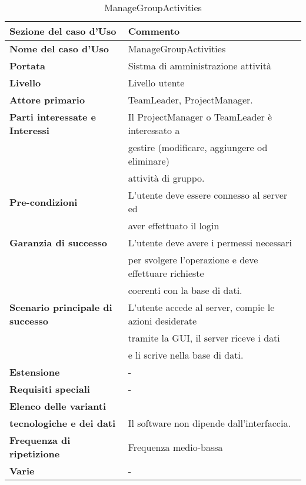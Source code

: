 \documentclass[12pt]{scrartcl}
\begin{document}
\begin{table}[h!]
  \caption{ManageGroupActivities}
  \label{tab:table6}
  \begin{tabular}{|l|l|}
    \toprule
    \textbf{Sezione del caso d'Uso} & \textbf{Commento}\\
    \midrule
    \textbf{Nome del caso d'Uso} & ManageGroupActivities\\
    \midrule
    \textbf{Portata} & Sistma di amministrazione attivit\`a \\
    \midrule
    \textbf{Livello} & Livello utente\\
    \midrule
    \textbf{Attore primario} & TeamLeader, ProjectManager. \\
    \midrule
    \textbf{Parti interessate e Interessi} & Il ProjectManager o TeamLeader \`e interessato a
    \\& gestire (modificare, aggiungere od eliminare) 
    \\& attivit\`a di gruppo.\\
    \midrule
    \textbf{Pre-condizioni} & L'utente deve essere connesso al server ed
    \\& aver effettuato il login\\
    \midrule
    \textbf{Garanzia di successo} & L'utente deve avere i permessi necessari 
    \\& per svolgere l'operazione e deve effettuare richieste
    \\& coerenti con la base di dati.\\
    \midrule
    \textbf{Scenario principale di successo} & L'utente accede al server, compie le azioni desiderate
    \\& tramite la GUI, il server riceve i dati 
    \\& e li scrive nella base di dati.\\
    \midrule
    \textbf{Estensione} & - \\
    \midrule
    \textbf{Requisiti speciali} & - \\
    \midrule
    \textbf{Elenco delle varianti}\\ \textbf{tecnologiche e dei dati} & Il software non dipende dall'interfaccia.\\
    \midrule
    \textbf{Frequenza di ripetizione} & Frequenza medio-bassa\\
    \midrule
    \textbf{Varie} & - \\
    \bottomrule
  \end{tabular}
\end{table}
\end{document}
